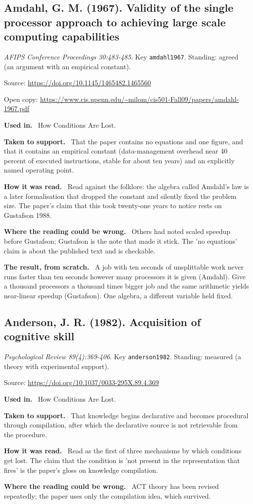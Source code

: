 \documentclass[11pt,oneside]{article}
\newcommand{\field}[1]{\par\noindent\textbf{\color{accent}#1.}\ }
\begin{document}
\subsection*{Amdahl, G. M. (1967). Validity of the single processor approach to achieving large scale computing capabilities}
\noindent\small\emph{AFIPS Conference Proceedings 30:483-485}. Key \texttt{amdahl1967}. Standing: agreed (an argument with an empirical constant).
\par\noindent\small Source: \url{https://doi.org/10.1145/1465482.1465560}
\par\noindent\small Open copy: \url{https://www.cis.upenn.edu/~milom/cis501-Fall09/papers/amdahl-1967.pdf}
\normalsize
\field{Used in} How Conditions Are Lost.
\field{Taken to support} That the paper contains no equations and one figure, and that it contains an empirical constant (data-management overhead near 40 percent of executed instructions, stable for about ten years) and an explicitly named operating point.
\field{How it was read} Read against the folklore: the algebra called Amdahl's law is a later formalisation that dropped the constant and silently fixed the problem size. The paper's claim that this took twenty-one years to notice rests on Gustafson 1988.
\field{Where the reading could be wrong} Others had noted scaled speedup before Gustafson; Gustafson is the note that made it stick. The 'no equations' claim is about the published text and is checkable.
\field{The result, from scratch} A job with ten seconds of unsplittable work never runs faster than ten seconds however many processors it is given (Amdahl). Give a thousand processors a thousand times bigger job and the same arithmetic yields near-linear speedup (Gustafson). One algebra, a different variable held fixed.

\hypertarget{src:anderson1982}{}
\subsection*{Anderson, J. R. (1982). Acquisition of cognitive skill}
\noindent\small\emph{Psychological Review 89(4):369-406}. Key \texttt{anderson1982}. Standing: measured (a theory with experimental support).
\par\noindent\small Source: \url{https://doi.org/10.1037/0033-295X.89.4.369}
\normalsize
\field{Used in} How Conditions Are Lost.
\field{Taken to support} That knowledge begins declarative and becomes procedural through compilation, after which the declarative source is not retrievable from the procedure.
\field{How it was read} Read as the first of three mechanisms by which conditions get lost. The claim that the condition is 'not present in the representation that fires' is the paper's gloss on knowledge compilation.
\field{Where the reading could be wrong} ACT theory has been revised repeatedly; the paper uses only the compilation idea, which survived.
\end{document}
